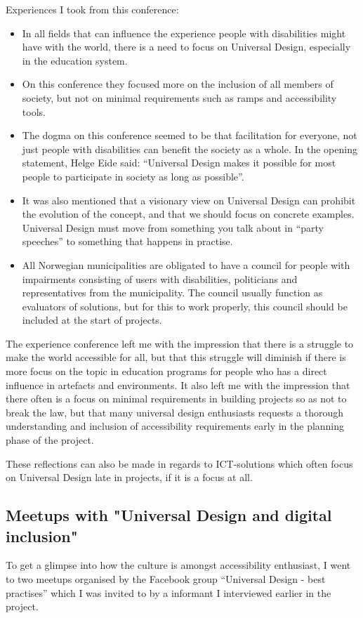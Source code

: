 Experiences I took from this conference:
\begin{itemize}
\item In all fields that can influence the experience people with disabilities might have with the world, there is a need to focus on Universal Design, especially in the education system.
\item On this conference they focused more on the inclusion of all members of society, but not on minimal requirements such as ramps and accessibility tools. 
\item The dogma on this conference seemed to be that facilitation for everyone, not just people with disabilities can benefit the society as a whole. In the opening statement, Helge Eide said: “Universal Design makes it possible for most people to participate in society as long as possible”. 
\item It was also mentioned that a visionary view on Universal Design can prohibit the evolution of the concept, and that we should focus on concrete examples. Universal Design must move from something you talk about in “party speeches” to something that happens in practise.
\item All Norwegian municipalities are obligated to have a council for people with impairments consisting of users with disabilities, politicians and representatives from the municipality. The council usually function as evaluators of solutions, but for this to work properly, this council should be included at the start of projects. 
\end{itemize}

The experience conference left me with the impression that there is a struggle to make the world accessible for all, but that this struggle will diminish if there is more focus on the topic in education programs for people who has a direct influence in artefacts and environments. It also left me with the impression that there often is a focus on minimal requirements in building projects so as not to break the law, but that many universal design enthusiasts requests a thorough understanding and inclusion of accessibility requirements early in the planning phase of the project.

These reflections can also be made in regards to ICT-solutions which often focus on Universal Design late in projects, if it is a focus at all. 

\subsection{Meetups with "Universal Design and digital inclusion"}
To get a glimpse into how the culture is amongst accessibility enthusiast, I went to two meetups organised by the Facebook group “Universal Design - best practises” which I was invited to by a informant I interviewed earlier in the project. 


